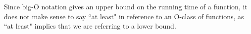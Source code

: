 Since big-O notation gives an upper bound on the running time of a function,
it does not make sense to say ``at least" in reference to an O-class
of functions,
as ``at least" implies that we are referring to a lower bound.

